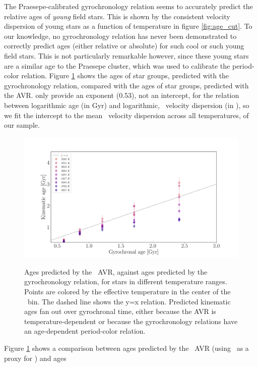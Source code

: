 The Praesepe-calibrated gyrochronology relation seems to accurately predict
the relative ages of {\it young} field stars.
This is shown by the consistent velocity dispersion of young stars as a
function of temperature in figure \ref{fig:age_cut}.
To our knowledge, no gyrochronology relation has never been demonstrated to
correctly predict ages (either relative or absolute) for such cool or such
young field stars.
This is not particularly remarkable however, since these young stars are a
similar age to the Praesepe cluster, which was used to calibrate the
period-color relation.
Figure \ref{fig:age_comparison} shows the ages of star groups, predicted with
the \citet{angus2019} gyrochronology relation, compared with the ages of star
groups, predicted with the \citet{holmberg2009} AVR.
\citet{holmberg2009} only provide an exponent (0.53), not an intercept, for the
relation between logarithmic age (in Gyr) and logarithmic, \vz\ velocity
dispersion (in \kms), so we fit the intercept to the mean \vb\ velocity
dispersion across all temperatures, of our sample.
\begin{figure}
  \caption{
      Ages predicted by the \citet{holmberg2009} \vz\ AVR, against ages
    predicted by the \citet{angus2019} gyrochronology relation, for stars in
    different temperature ranges.
Points are colored by the effective temperature in the center of the \teff\
bin.
The dashed line shows the y=x relation.
Predicted kinematic ages fan out over gyrochronal time, either because the AVR
    is temperature-dependent or because the gyrochronology relations have an
    age-dependent period-color relation.
}
  \centering
    \includegraphics[width=1\textwidth]{age_comparison}
\label{fig:age_comparison}
\end{figure}
Figure \ref{fig:age_comparison} shows a comparison between ages predicted by
the \citet{holmberg2009} \vz\ AVR (using \vb\ as a proxy for \vz) and ages
